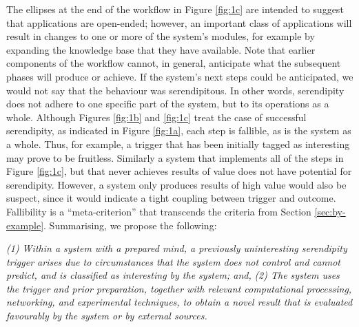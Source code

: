 The ellipses at the end of the workflow in Figure \ref{fig:1c} are
intended to suggest that applications are open-ended; however, an
important class of applications will result in changes to one or more
of the system's modules, for example by expanding the knowledge base
that they have available.  Note that earlier components of the workflow
cannot, in general, anticipate what the subsequent phases will produce
or achieve.  If the system's next steps could be anticipated, we would
not say that the behaviour was serendipitous.  In other words,
serendipity does not adhere to one specific part of the system, but to
its operations as a whole.  Although Figures  \ref{fig:1b} and  \ref{fig:1c}
treat the case of successful serendipity, as indicated in Figure
 \ref{fig:1a}, each step is fallible, as is the system as a whole.
Thus, for example, a trigger that has been initially tagged as interesting may prove to be fruitless.
Similarly a system that implements all of the steps in Figure \ref{fig:1c}, but that never
achieves results of value does not have potential for serendipity.
However, a system only produces results of high value would also be
suspect, since it would indicate a tight coupling between trigger
and outcome.  Fallibility is a ``meta-criterion'' that transcends the criteria from Section \ref{sec:by-example}.
Summarising, we propose the following:
\begin{ndef}
\emph{(1) Within a system with a prepared mind, a previously uninteresting serendipity trigger arises due to circumstances that the system does not control and cannot predict, and is classified as interesting by the system; and,}
\emph{(2) The system uses the trigger and prior preparation, together with relevant computational processing, networking, and experimental techniques, to obtain a novel result that is evaluated favourably by the system or by external sources.}
\end{ndef}


